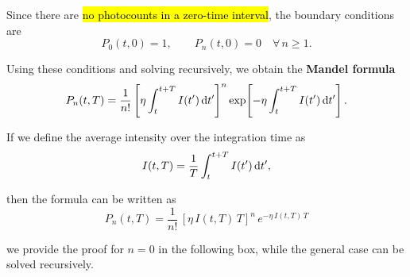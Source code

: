 Since there are \hl{no photocounts in a zero-time interval}, the boundary conditions are
\begin{equation}\label{eqn:7-photon-statistics-initial-conditions}
P_0(t,0)=1, \qquad P_n(t,0)=0 \quad \forall\, n\ge 1.
\end{equation}

Using these conditions and solving recursively, we obtain the \textbf{Mandel formula}
\begin{equation}\label{eqn:7-mandel-formula}
P_n(t,T)=\frac{1}{n!}\left[\eta \int_t^{t+T} I(t')\,\mathrm{d} t'\right]^n
\exp\!\left[-\eta \int_t^{t+T} I(t')\,\mathrm{d} t'\right].
\end{equation}

If we define the average intensity over the integration time as
\begin{equation}\label{eqn:7-average-intensity}
I(t,T)=\frac{1}{T}\int_t^{t+T} I(t')\,\mathrm{d} t',
\end{equation}

then the formula can be written as
\begin{equation}\label{eqn:7-mandel-formula-2}
P_n(t,T)=\frac{1}{n!}\,[\eta\,I(t,T)\,T]^n\,e^{-\eta\,I(t,T)\,T}
\end{equation}

we provide the proof for $n=0$ in the following box, while the general case can be solved recursively.

